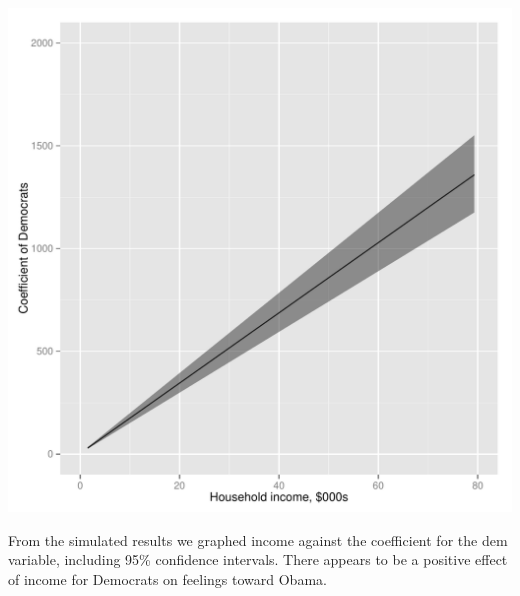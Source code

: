 \documentclass[12pt]{article}
\begin{document}
\begin{enumerate}
\includegraphics{Rplots.pdf}

From the simulated results we graphed income against the coefficient for the dem variable, including 95\% confidence intervals.  There appears to be a positive effect of income for Democrats on feelings toward Obama.

\end{enumerate}
\end{document}
